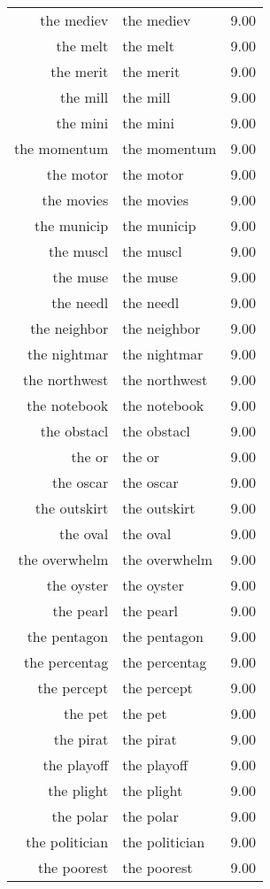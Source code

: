 \begin{table}[ht]
\begin{tabular}{rlr}
  the mediev & the mediev & 9.00 \\ 
  the melt & the melt & 9.00 \\ 
  the merit & the merit & 9.00 \\ 
  the mill & the mill & 9.00 \\ 
  the mini & the mini & 9.00 \\ 
  the momentum & the momentum & 9.00 \\ 
  the motor & the motor & 9.00 \\ 
  the movies & the movies & 9.00 \\ 
  the municip & the municip & 9.00 \\ 
  the muscl & the muscl & 9.00 \\ 
  the muse & the muse & 9.00 \\ 
  the needl & the needl & 9.00 \\ 
  the neighbor & the neighbor & 9.00 \\ 
  the nightmar & the nightmar & 9.00 \\ 
  the northwest & the northwest & 9.00 \\ 
  the notebook & the notebook & 9.00 \\ 
  the obstacl & the obstacl & 9.00 \\ 
  the or & the or & 9.00 \\ 
  the oscar & the oscar & 9.00 \\ 
  the outskirt & the outskirt & 9.00 \\ 
  the oval & the oval & 9.00 \\ 
  the overwhelm & the overwhelm & 9.00 \\ 
  the oyster & the oyster & 9.00 \\ 
  the pearl & the pearl & 9.00 \\ 
  the pentagon & the pentagon & 9.00 \\ 
  the percentag & the percentag & 9.00 \\ 
  the percept & the percept & 9.00 \\ 
  the pet & the pet & 9.00 \\ 
  the pirat & the pirat & 9.00 \\ 
  the playoff & the playoff & 9.00 \\ 
  the plight & the plight & 9.00 \\ 
  the polar & the polar & 9.00 \\ 
  the politician & the politician & 9.00 \\ 
  the poorest & the poorest & 9.00 \\ 

\end{tabular}
\end{table}
